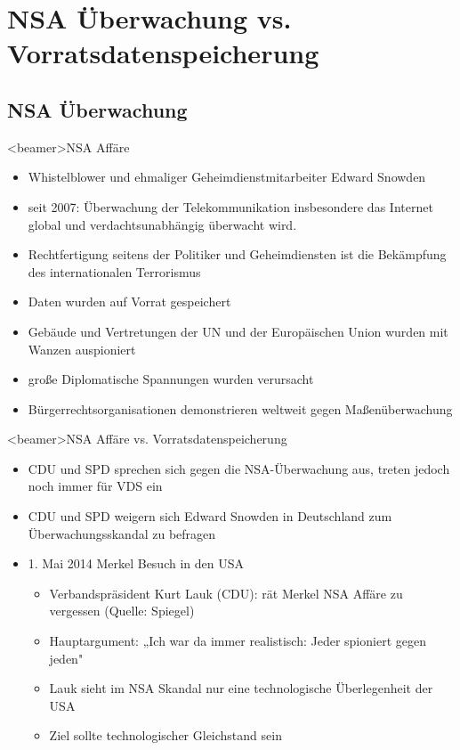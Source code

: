 \section{NSA Überwachung vs. Vorratsdatenspeicherung}
  \subsection{NSA Überwachung}
    \begin{frame}<beamer>{NSA Affäre}
      \begin{itemize}
        \item  Whistelblower und ehmaliger Geheimdienstmitarbeiter Edward Snowden 
        \item  seit 2007: Überwachung der Telekommunikation insbesondere  das Internet global und verdachtsunabhängig überwacht wird.
        \item  Rechtfertigung seitens der Politiker und Geheimdiensten ist die Bekämpfung des internationalen Terrorismus
        \item  Daten wurden auf Vorrat gespeichert
        \item  Gebäude und Vertretungen der UN und der Europäischen Union wurden mit Wanzen auspioniert
        \item  große Diplomatische Spannungen wurden verursacht
        \item  Bürgerrechtsorganisationen demonstrieren weltweit gegen Maßenüberwachung
      \end{itemize}
    \end{frame}
    \begin{frame}<beamer>{NSA Affäre vs. Vorratsdatenspeicherung}
      \begin{itemize}
        \item CDU und SPD sprechen sich gegen die NSA-Überwachung aus, treten jedoch noch immer für VDS ein
        \item CDU und SPD weigern sich Edward Snowden in Deutschland zum Überwachungsskandal zu befragen 
        \item 1. Mai 2014 Merkel Besuch in den USA
         \begin{itemize}
          \item Verbandspräsident Kurt Lauk (CDU): rät Merkel NSA Affäre zu vergessen (Quelle: Spiegel)
          \item Hauptargument: „Ich war da immer realistisch: Jeder spioniert gegen jeden"
          \item Lauk sieht im NSA Skandal nur eine technologische Überlegenheit der USA
          \item Ziel sollte technologischer Gleichstand sein
            \end{itemize}
      \end{itemize}
    \end{frame}
